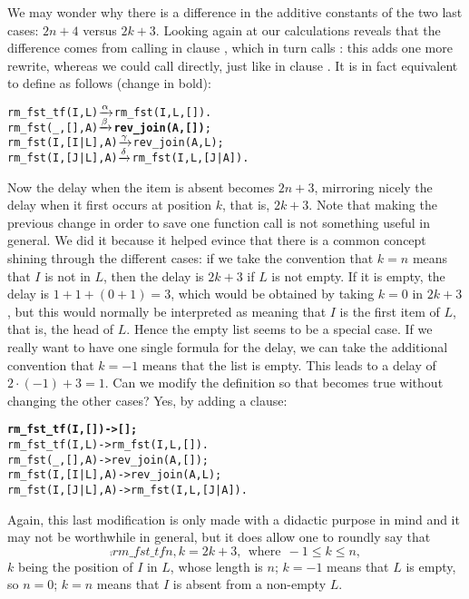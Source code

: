 We may wonder why there is a difference in the additive constants of
the two last cases: \(2n+4\) versus \(2k+3\). Looking again at our
calculations reveals that the difference comes from calling
 in clause \clause{\beta}, which in turn calls
: this adds one more rewrite, whereas we
could call  directly, just like in clause
\clause{\gamma}. It is in fact equivalent to define
 as follows (change in bold):
\begin{alltt}
rm_fst_tf(I,L)    \(\smashedrightarrow{\alpha}\) rm_fst(I,L,[]).
rm_fst(_,   [],A) \(\smashedrightarrow{\beta}\) \textbf{rev\_join(A,[])};
rm_fst(I,[I|L],A) \(\smashedrightarrow{\gamma}\) rev_join(A,L);
rm_fst(I,[J|L],A) \(\smashedrightarrow{\delta}\) rm_fst(I,L,[J|A]).
\end{alltt}
Now the delay when the item is absent becomes \(2n+3\), mirroring
nicely the delay when it first occurs at position \(k\), that is,
\(2k+3\). Note that making the previous change in order to save one
function call is not something useful in general. We did it because it
helped evince that there is a common concept shining through the
different cases: if we take the convention that \(k=n\) means that
\(I\) is not in \(L\), then the delay is \(2k+3\) if \(L\) is not
empty. If it is empty, the delay is \(1+1+(0+1)=3\), which would be
obtained by taking \(k=0\) in \(2k+3\), but this would normally be
interpreted as meaning that \(I\) is the first item of \(L\), that is,
the head of \(L\). Hence the empty list seems to be a special case. If
we really want to have one single formula for the delay, we can take
the additional convention that \(k=-1\) means that the list is
empty. This leads to a delay of \(2 \cdot (-1)+3=1\). Can we modify
the definition so that becomes true without changing the other cases?
Yes, by adding a clause:
\begin{alltt}
\textbf{rm_fst_tf(I,[])   -> [];}
rm_fst_tf(I, L)   -> rm_fst(I,L,[]).
rm_fst(_,   [],A) -> rev_join(A,[]);
rm_fst(I,[I|L],A) -> rev_join(A,L);
rm_fst(I,[J|L],A) -> rm_fst(I,L,[J|A]).
\end{alltt}
Again, this last modification is only made with a didactic purpose in
mind and it may not be worthwhile in general, but it does allow one to
roundly say that
\[
\comp{rm\_fst\_tf}{n,k} = 2k+3,\,\; \text{where} \,\; -1 \leqslant k
\leqslant n,
\]
\(k\) being the position of \(I\) in \(L\), whose length is \(n\);
\(k=-1\) means that \(L\) is empty, so \(n=0\); \(k=n\) means that
\(I\) is absent from a non\hyp{}empty \(L\).


